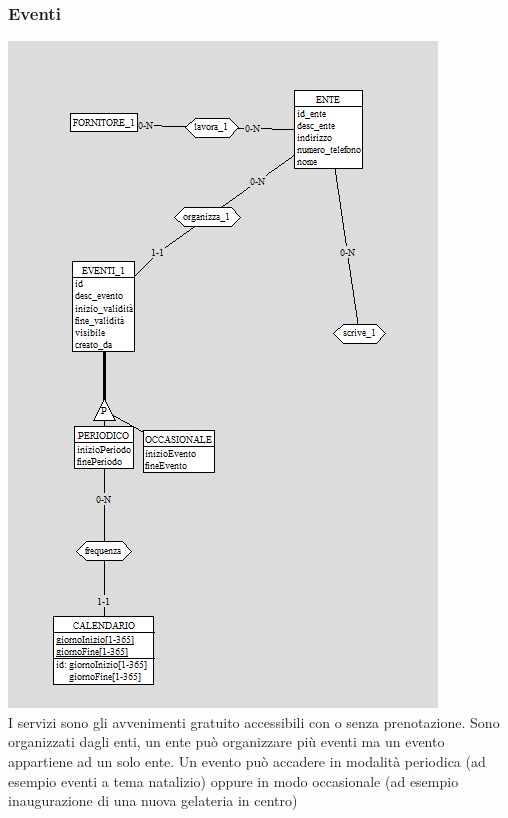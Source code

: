 \subsubsection{Eventi}
\includegraphics[width=0.95\columnwidth]{images/Eventi.png} \\
I servizi sono gli avvenimenti gratuito accessibili con o senza prenotazione.
Sono organizzati dagli enti, un ente può organizzare più eventi ma un evento appartiene ad un solo ente.
Un evento può accadere in modalità periodica (ad esempio eventi a tema natalizio) oppure in modo occasionale (ad esempio inaugurazione di una nuova gelateria in centro)
